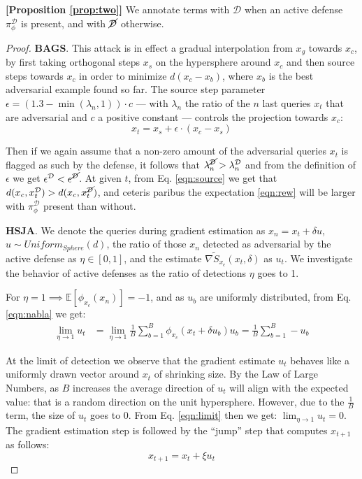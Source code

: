 \textbf{[Proposition \ref{prop:two}]}
We annotate terms with $\mathcal{D}$ when an active defense $\pi_\phi^{\mathcal{D}}$ is present, and with $\cancel{\mathcal{D}}$ otherwise.
\begin{proof}
\textbf{BAGS}.
This attack is in effect a gradual interpolation from $x_g$ towards $x_c$, by first taking orthogonal steps $x_s$ on the hypersphere around $x_c$ and then source steps towards $x_c$ in order to minimize $d(x_c - x_b)$, where $x_b$ is the best adversarial example found so far.
The source step parameter $\epsilon = (1.3 - \min(\lambda_n, 1)) \cdot c$ --- with $\lambda_n$ the ratio of the $n$ last queries $x_t$ that are adversarial and $c$ a positive constant --- controls the projection towards $x_c$:
\begin{equation}
    x_t = x_s + \epsilon \cdot (x_c - x_s)
\label{eqn:source}
\end{equation}

Then if we again assume that a non-zero amount of the adversarial queries $x_t$ is flagged as such by the defense, it follows that $\lambda^{\cancel{\mathcal{D}}}_n > \lambda^\mathcal{D}_n$ and from the definition of $\epsilon$ we get $\epsilon^\mathcal{D} < \epsilon^{\cancel{\mathcal{D}}}$.
At given $t$, from Eq. \eqref{eqn:source} we get that $d(x_c,x^\mathcal{D}_t) > d(x_c, x^{\cancel{\mathcal{D}}}_t)$, and ceteris paribus the expectation \eqref{eqn:rew} will be larger with $\pi_\phi^{\mathcal{D}}$ present than without.

\textbf{HSJA}.
We denote the queries during gradient estimation as $x_n = x_t + \delta u$, $u \sim Uniform_{Sphere}(d)$, the ratio of those $x_n$ detected as adversarial by the active defense as $\eta \in [0,1]$, and the estimate $\widetilde{\nabla S_{x_c}}(x_t,\delta)$ as $u_t$.
We investigate the behavior of active defenses as the ratio of detections $\eta$ goes to 1.

For $\eta = 1 \implies \mathbb{E}[\phi_{x_c}(x_n)] = -1$, and as $u_b$ are uniformly distributed, from Eq. \eqref{eqn:nabla} we get:
\begin{equation}
\begin{aligned}
    \lim_{\eta\to1} u_t &= \lim_{\eta\to1} \frac{1}{B} \sum_{b=1}^{B} \phi_{x_c}(x_t + \delta u_b)u_b = \frac{1}{B} \sum_{b=1}^{B} -u_b
\label{eqn:limit}
\end{aligned}
\end{equation}

At the limit of detection we observe that the gradient estimate $u_t$ behaves like a uniformly drawn vector around $x_t$ of shrinking size.
By the Law of Large Numbers, as $B$ increases the average direction of $u_t$ will align with the expected value: that is a random direction on the unit hypersphere.
However, due to the $\frac{1}{B}$ term, the size of $u_t$ goes to 0.
From Eq. \eqref{eqn:limit} then we get: $\lim_{\eta\to1} u_t = 0$.
The gradient estimation step is followed by the ``jump'' step that computes $x_{t+1}$ as follows:
\begin{equation}
    x_{t+1} = x_t + \xi {u_t}
\end{equation}


\end{proof}
